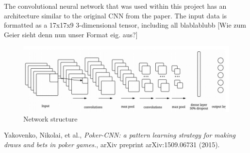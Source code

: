 \documentclass[]{report}
\begin{document}
The convolutional neural network that was used within this project has an architecture similar to the original CNN from the paper\cite{1}. The input data is formatted as a 17x17x9 3-dimensional tensor, including all blablablubb [Wie zum Geier sieht denn nun unser Format eig. aus?]


\begin{figure}[h]
	\caption{Network structure}
	\includegraphics[scale = 0.5]{cnn_structure.jpg}
\end{figure}

\begin{thebibliography}{}
	 Yakovenko, Nikolai, et al., \emph{Poker-CNN: a pattern learning strategy for making draws and bets in poker games.}, arXiv preprint arXiv:1509.06731 (2015).
\end{thebibliography}  
\end{document}
